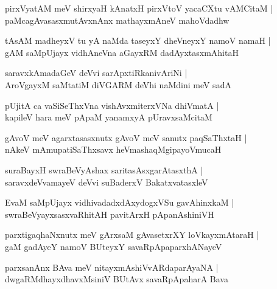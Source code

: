 \documentclass[twoside,12pt,openright]{book}
\newcounter{shloka}[chapter]
\begin{document}
\begin{shloka}%
pirxVyatAM meV shirxyaH kAnatxH pirxVtoV yacaCXtu vAMCitaM |\\
paMcagAvasasxmutAvxnAnx mathayxmAneV mahoVdadhw
\end{shloka}

\begin{shloka}%
tAsAM madheyxV tu yA naMda taseyxY dheVneyxY namoV namaH |\\
gAM saMpUjayx vidhAneVna aGayxRM dadAyxtasxmAhitaH 
\end{shloka}

\begin{shloka}%
saravxkAmadaGeV deVvi sarApxtiRkanivAriNi |\\
AroVgayxM saMtatiM diVGARM deVhi naMdini meV sadA 
\end{shloka}

\begin{shloka}%
pUjitA ca vaSiSeThxVna vishAvxmiterxVNa dhiVmatA |\\
kapileV hara meV pApaM yanamxyA pUravxsaMcitaM 
\end{shloka}

\begin{shloka}%
gAvoV meV agarxtasasxnutx gAvoV meV sanutx paqSaThxtaH |\\
nAkeV mAmupatiSaThxsavx heVmashaqMgipayoVmucaH
\end{shloka}

\begin{shloka}%
suraBayxH swraBeVyAshax saritasAsxgarAtasxthA |\\
saravxdeVvamayeV deVvi suBaderxV BakatxvatasxleV 
\end{shloka}

\begin{shloka}%
EvaM saMpUjayx vidhivadadxdAxydogxVSu gavAhinxkaM |\\
swraBeVyayxsasxvaRhitAH pavitArxH pApanAshiniVH
\end{shloka}

\begin{shloka}%
parxtigaqhaNxnutx meV gArxsaM gAvasetxrXY loVkayxmAtaraH |\\
gaM gadAyeY namoV BUteyxY savaRpApaparxhANayeV 
\end{shloka}

\begin{shloka}%
parxsanAnx BAva meV nitayxmAshiVvARdaparAyaNA |\\
dwgaRMdhayxdhavxMsiniV BUtAvx savaRpApaharA Bava
\end{shloka}
\end{document}
